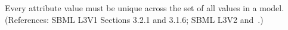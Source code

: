 Every  attribute value must be unique across the set of all
 values in a model.  (References: SBML L3V1 Sections 3.2.1 and 3.1.6; SBML L3V2
 and~.)
